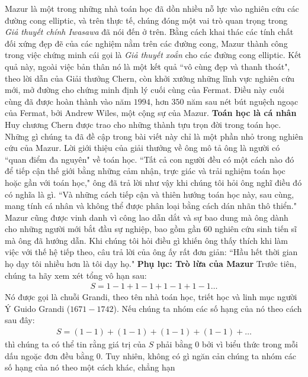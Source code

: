 \begin{multicols}{2}
	\vskip 0.01cm
	Mazur là một trong những nhà toán học đã dồn nhiều nỗ lực vào nghiên cứu các đường cong elliptic, và trên thực tế, chúng đóng một vai trò quan trọng trong \textit{Giả thuyết chính Iwasawa} đã nói đến ở trên. Bằng cách khai thác các tính chất đối xứng đẹp đẽ của các nghiệm nằm trên các đường cong, Mazur thành công trong  việc chứng minh cái gọi là \textit{Giả thuyết xoắn} cho các đường cong elliptic. Kết quả này, ngoài việc bản thân nó là một kết quả ``vô cùng đẹp và thanh thoát", theo lời dẫn của Giải thưởng Chern, còn khởi xướng những lĩnh vực nghiên cứu mới, mở đường cho chứng minh định lý cuối cùng của Fermat. Điều này cuối cùng đã được hoàn thành vào năm $1994$, hơn $350$ năm sau nét bút nguệch ngoạc của Fermat, bởi Andrew Wiles, một cộng sự của Mazur.
	\vskip 0.05cm
	\textbf{\color{duongvaotoanhoc}Toán học là cá nhân}
	\vskip 0.05cm
	Huy chương Chern được trao cho những thành tựu trọn đời trong toán học. Những gì chúng ta đã đề cập trong bài viết này chỉ là một phần nhỏ trong nghiên cứu của Mazur.
	\vskip 0.05cm
	Lời giới thiệu của giải thưởng về ông mô tả ông là người có ``quan điểm đa nguyên" về toán học. ``Tất cả con người đều có một  cách nào đó để tiếp cận thế giới bằng những cảm nhận, trực giác và trải nghiệm toán học hoặc gần với toán học," ông đã trả lời như vậy khi chúng tôi hỏi ông nghĩ điều đó có nghĩa là gì. ``Và những cách tiếp cận và thiên hướng toán học này, sau cùng, mang tính cá nhân và không thể được phân loại bằng cách dán nhãn thô thiển."
	\vskip 0.05cm
	Mazur cũng được vinh danh vì công lao dẫn dắt và sự bao dung mà ông dành cho những người mới bắt đầu sự nghiệp, bao gồm gần $60$ nghiên cứu sinh tiến sĩ mà ông đã hướng dẫn. Khi chúng tôi hỏi điều gì khiến ông thấy thích khi làm việc với thế hệ tiếp theo, câu trả lời của ông ấy rất đơn giản: ``Hầu hết thời gian  họ dạy tôi nhiều hơn là tôi dạy họ."
	\vskip 0.05cm
	\textbf{\color{duongvaotoanhoc}Phụ lục: Trò lừa của Mazur}
	\vskip 0.05cm
	Trước tiên, chúng ta hãy xem xét tổng vô hạn sau:
	\begin{align*}
		S = 1-1 + 1-1 + 1-1 + 1-1\ldots
	\end{align*}
	Nó được gọi là chuỗi Grandi, theo tên nhà toán học, triết học và linh mục người Ý Guido Grandi ($1671-1742$).
	\vskip 0.05cm
	Nếu chúng ta nhóm các số hạng của nó theo cách sau đây: 
	\begin{align*}
		S \!=\! (1\!-\!1) \!+\! (1\!-\!1) \!+\! (1\!-\!1) \!+\! (1\!-\!1) \!+\! \ldots
	\end{align*}
	thì chúng ta có thể tin rằng giá trị của $S$ phải bằng 0 bởi vì biểu thức trong mỗi dấu ngoặc đơn đều bằng 0. Tuy nhiên, không có gì ngăn cản chúng ta nhóm các số hạng của nó theo một cách khác, chẳng hạn

\end{multicols}
